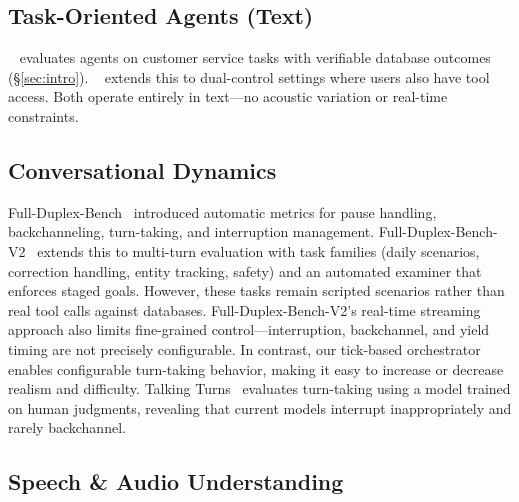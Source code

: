 \subsection{Task-Oriented Agents (Text)}

\taubench{}~\cite{yao_-bench_2024} evaluates agents on customer service tasks with verifiable database outcomes (\S\ref{sec:intro}). \tautwobench{}~\cite{barres_2-bench_2025} extends this to dual-control settings where users also have tool access. Both operate entirely in text---no acoustic variation or real-time constraints.

\subsection{Conversational Dynamics}

Full-Duplex-Bench~\cite{lin_full-duplex-bench_2025} introduced automatic metrics for pause handling, backchanneling, turn-taking, and interruption management. Full-Duplex-Bench-V2~\cite{lin_full-duplex-bench-v2_2025} extends this to multi-turn evaluation with task families (daily scenarios, correction handling, entity tracking, safety) and an automated examiner that enforces staged goals. However, these tasks remain scripted scenarios rather than real tool calls against databases. Full-Duplex-Bench-V2's real-time streaming approach also limits fine-grained control---interruption, backchannel, and yield timing are not precisely configurable. In contrast, our tick-based orchestrator enables configurable turn-taking behavior, making it easy to increase or decrease realism and difficulty. Talking Turns~\cite{arora_talking_2025} evaluates turn-taking using a model trained on human judgments, revealing that current models interrupt inappropriately and rarely backchannel.

\subsection{Speech \& Audio Understanding}

